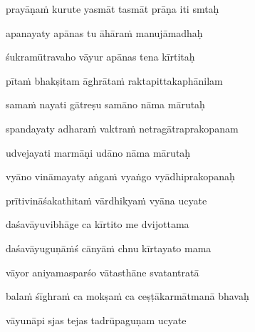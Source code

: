 prayāṇa\.m kurute yasmāt tasmāt prāṇa iti smtaḥ \veg\dontdisplaylinenum

apanayaty apānas tu āhāra\.m manujāmadhaḥ\thinspace{\dandab} \dontdisplaylinenum

śukramūtravaho vāyur apānas tena kīrtitaḥ \veg\dontdisplaylinenum

pīta\.m bhakṣitam āghrāta\.m raktapittakaphānilam\thinspace{\dandab} \dontdisplaylinenum

sama\.m nayati gātreṣu samāno nāma mārutaḥ \veg\dontdisplaylinenum

spandayaty adhara\.m vaktra\.m netragātraprakopanam\thinspace{\dandab} \dontdisplaylinenum

udvejayati marmāṇi udāno nāma mārutaḥ \veg\dontdisplaylinenum

vyāno vināmayaty aṅga\.m vyaṅgo vyādhiprakopanaḥ\thinspace{\dandab} \dontdisplaylinenum

prītivināśakathita\.m vārdhikya\.m vyāna ucyate \veg\dontdisplaylinenum

daśavāyuvibhāge ca kīrtito me dvijottama\thinspace{\dandab} \dontdisplaylinenum

daśavāyuguṇā\.mś cānyā\.m chnu kīrtayato mama \veg\dontdisplaylinenum

vāyor aniyamasparśo vātasthāne svatantratā\thinspace{\dandab} \dontdisplaylinenum

bala\.m śīghra\.m ca mokṣa\.m ca ceṣṭākarmātmanā bhavaḥ \veg\dontdisplaylinenum


vāyunāpi sjas tejas tadrūpaguṇam ucyate\thinspace{\dandab} \dontdisplaylinenum

